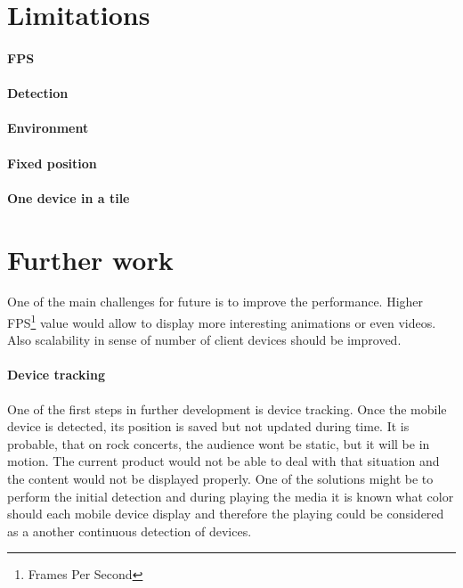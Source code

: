 \section{Limitations}


\paragraph{FPS}

\paragraph{Detection}

\paragraph{Environment}

\paragraph{Fixed position}

\paragraph{One device in a tile}

\section{Further work}
One of the main challenges for future is to improve the performance.
Higher FPS\footnote{Frames Per Second} value would allow to display more interesting animations or even videos.
Also scalability in sense of number of client devices should be improved.

\paragraph{Device tracking}
One of the first steps in further development is device tracking.
Once the mobile device is detected, its position is saved but not updated during time.
It is probable, that on rock concerts, the audience wont be static, but it will be in motion.
The current product would not be able to deal with that situation and the content would not be displayed properly.
One of the solutions might be to perform the initial detection and during playing the media it is known what color should each mobile device display and therefore the playing could be considered as a another continuous detection of devices.

